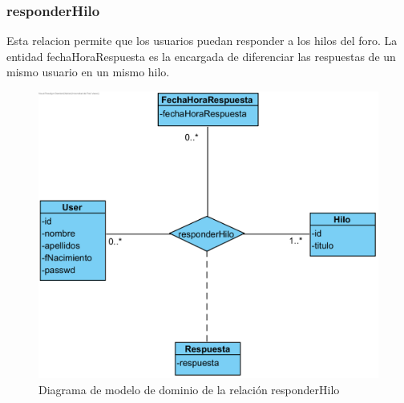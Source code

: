 ﻿\documentclass{report}
\begin{document}
                \subsubsection{responderHilo}
                    Esta relacion permite que los usuarios puedan responder a los hilos del foro. La entidad fechaHoraRespuesta es la encargada de diferenciar las respuestas de un mismo usuario en un mismo hilo.
                    \begin{figure}[H]
                        \centering
                        \includegraphics[width=1.0\textwidth]{img/dominio/responderHilo.png}
                        \caption{Diagrama de modelo de dominio de la relación responderHilo}
                    \end{figure}
                \clearpage
\end{document}
